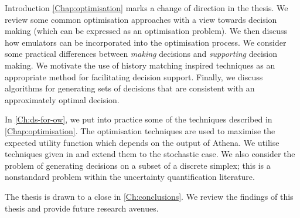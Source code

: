 \begin{chapter}{Introduction \label{Ch:Intro}}
\cref{Chap:optimisation} marks a change of direction in the thesis. We review some common optimisation approaches with a view towards decision making (which can be expressed as an optimisation problem). We then discuss how emulators can be incorporated into the optimisation process. We consider some practical differences between \textit{making} decisions and \textit{supporting} decision making. We motivate the use of history matching inspired techniques as an appropriate method for facilitating decision support. Finally, we discuss algorithms for generating sets of decisions that are consistent with an approximately optimal decision.

In \cref{Ch:ds-for-ow}, we put into practice some of the techniques described in \cref{Chap:optimisation}. The optimisation techniques are used to maximise the expected utility function which depends on the output of Athena. We utilise techniques given in \citet{Owen2020} and extend them to the stochastic case. We also consider the problem of generating decisions on a subset of a discrete simplex; this is a nonstandard problem within the uncertainty quantification literature.

The thesis is drawn to a close in \cref{Ch:conclusions}. We review the findings of this thesis and provide future research avenues.
\end{chapter}
